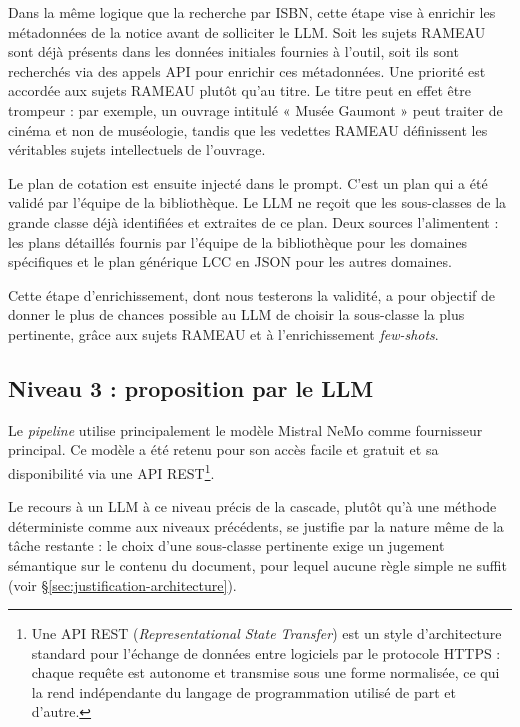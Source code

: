Dans la même logique que la recherche par ISBN, cette étape vise à enrichir les métadonnées de la notice avant de solliciter le LLM. Soit les sujets RAMEAU sont déjà présents dans les données initiales fournies à l'outil, soit ils sont recherchés via des appels API pour enrichir ces métadonnées. Une priorité est accordée aux sujets RAMEAU plutôt qu'au titre. Le titre peut en effet être trompeur : par exemple, un ouvrage intitulé « Musée Gaumont » peut traiter de cinéma et non de muséologie, tandis que les vedettes RAMEAU définissent les véritables sujets intellectuels de l'ouvrage.

Le plan de cotation est ensuite injecté dans le prompt. C'est un plan qui a été validé par l'équipe de la bibliothèque. Le LLM ne reçoit que les sous-classes de la grande classe déjà identifiées et extraites de ce plan. Deux sources l'alimentent : les plans détaillés fournis par l'équipe de la bibliothèque pour les domaines spécifiques et le plan générique LCC en JSON pour les autres domaines.


Cette étape d'enrichissement, dont nous testerons la validité, a pour objectif de donner le plus de chances possible au LLM de choisir la sous-classe la plus pertinente, grâce aux sujets RAMEAU et à l'enrichissement \textit{few-shots}.



\subsection{Niveau 3 : proposition par le LLM}
\label{sec:niveau3-llm}


Le \textit{pipeline}  utilise principalement le modèle Mistral NeMo comme fournisseur principal. Ce modèle a été retenu pour son accès facile et gratuit et sa disponibilité via une API REST\footnote{Une API REST (\textit{Representational State Transfer}) est un style d'architecture standard pour l'échange de données entre logiciels par le protocole HTTPS : chaque requête est autonome et transmise sous une forme normalisée, ce qui la rend indépendante du langage de programmation utilisé de part et d'autre.}.

Le recours à un LLM à ce niveau précis de la cascade, plutôt qu'à une méthode déterministe comme aux niveaux précédents, se justifie par la nature même de la tâche restante : le choix d'une sous-classe pertinente exige un jugement sémantique sur le contenu du document, pour lequel aucune règle simple ne suffit (voir §\ref{sec:justification-architecture}).

